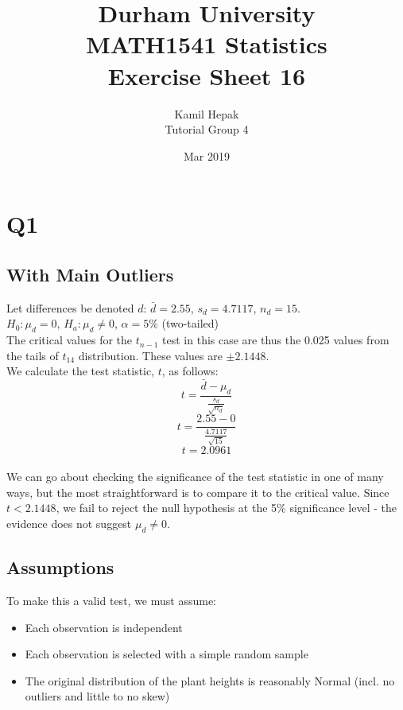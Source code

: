 \documentclass[]{article}
\title{\vspace{-3cm}Durham University\\
    MATH1541 Statistics \\
	Exercise Sheet 16}
\author{Kamil Hepak\\
        Tutorial Group 4}
\date{Mar 2019}
\begin{document}
\maketitle

\section{Q1}
\subsection{With Main Outliers}
Let differences be denoted $d$: $\bar{d} = 2.55$, $s_d = 4.7117$, $n_d = 15$.
\\
$H_0: \mu_d = 0$, $H_a: \mu_d \neq 0$, $\alpha = 5\%$ (two-tailed)
\\
The critical values for the $t_{n-1}$ test in this case are thus the 0.025 values from the tails of $t_{14}$ distribution. These values are $\pm 2.1448$.
\\
We calculate the test statistic, $t$, as follows:
$$t = \frac{\bar{d} - \mu_d}{\frac{s_d}{\sqrt{n_d}}}$$
$$t = \frac{2.55 - 0}{\frac{4.7117}{\sqrt{15}}}$$
$$t = 2.0961$$
\\
We can go about checking the significance of the test statistic in one of many ways, but the most straightforward is to compare it to the critical value. Since $t < 2.1448$, we fail to reject the null hypothesis at the 5\% significance level - the evidence does not suggest $\mu_d \neq 0$.

\subsection{Assumptions}
To make this a valid test, we must assume:
\begin{itemize}
    \item Each observation is independent
    \item Each observation is selected with a simple random sample
    \item The original distribution of the plant heights is reasonably Normal (incl. no outliers and little to no skew)
\end{itemize}
\end{document}
